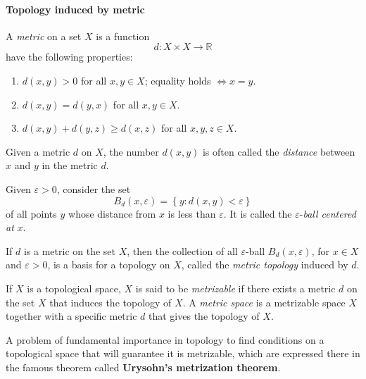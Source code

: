 \paragraph{Topology induced by metric}

\begin{definition}
  A \emph{metric} on a set \( X \) is a function
  \[
    d: X \times X \to \mathbb{R}
  \]
  have the following properties:
  \begin{enumerate}
    \item \( d(x, y) > 0 \) for all \( x , y \in X \); equality holds \( \iff x = y \).
    \item \( d(x, y) = d(y, x) \) for all \( x, y \in X \).
    \item \( d(x, y) + d(y, z) \geq d(x, z) \) for all \( x, y, z \in X \).
  \end{enumerate}
  Given a metric \( d \) on \( X \), the number \( d(x, y) \) is often called the \emph{distance} between \( x \) and \( y \) in the metric \( d \).
\end{definition}

\begin{definition}
  Given \( \varepsilon > 0 \), consider the set
  \[
    B_d(x, \varepsilon) = \left\lbrace y: d(x, y) < \varepsilon \right\rbrace
  \]
  of all points \( y \) whose distance from \( x \) is less than \( \varepsilon \).
  It is called the \( \varepsilon \)-\emph{ball centered at} \( x \).
\end{definition}

\begin{definition}
  If \( d \) is a metric on the set \( X \), then the collection of all \( \varepsilon \)-ball \( B_d(x, \varepsilon) \), for \( x \in X \) and \( \varepsilon > 0 \), is a basis for a topology on \( X \), called the \emph{metric topology} induced by \( d \).
\end{definition}

\begin{definition}
  If \( X \) is a topological space, \( X \) is said to be \emph{metrizable} if there exists a metric \( d \) on the set \( X \) that induces the topology of \( X \).
  A \emph{metric space} is a metrizable space \( X \) together with a specific metric \( d \) that gives the topology of \( X \).
\end{definition}
\begin{remark}
  A problem of fundamental importance in topology to find conditions on a topological space that will guarantee it is metrizable, which are expressed there in the famous theorem called \textbf{Urysohn's metrization theorem}.
\end{remark}

